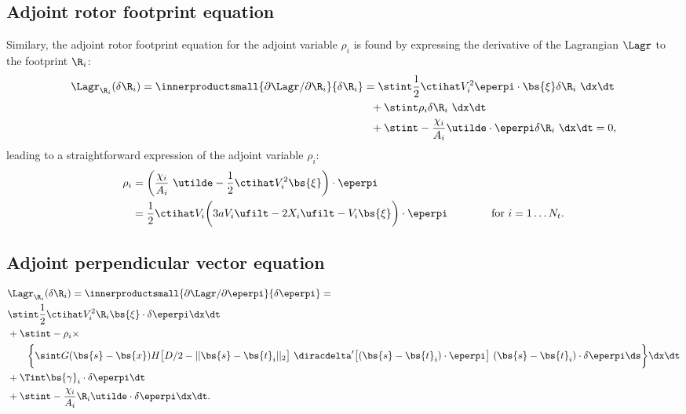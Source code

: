 \subsection{Adjoint rotor footprint equation}
Similary, the adjoint rotor footprint equation for the adjoint variable $\rho_i$ is found by expressing the derivative of the Lagrangian $\Lagr$ to the footprint $\R_i$: 
\begin{align}
\Lagr_{\R_i}(\delta \R_i) = \innerproductsmall{\partial \Lagr / \partial \R_i}{\delta \R_i} &= 
\stint \frac{1}{2} \ctihat V_i^2 \eperpi \cdot \bs{\xi} \delta \R_i ~\dx \dt \nonumber \\
& \ \ + \stint \rho_i \delta \R_i ~\dx \dt \nonumber \\
& \ \ + \stint -\frac{\chi_i}{A_i} \utilde \cdot \eperpi \delta \R_i ~\dx \dt = 0,
\end{align}    
leading to a straightforward expression of the adjoint variable $\rho_i$:
\begin{align}
\rho_i &= \bigg( \frac{\chi_i}{A_i}~\utilde - \frac{1}{2} \ctihat V_i^2 \bs{\xi} \bigg) \cdot \eperpi \label{eq:rho_i_1}  \\
 &= \frac{1}{2} \ctihat V_i \bigg(3aV_i \ufilt  -2 X_i \ufilt - V_i\bs{\xi} \bigg) \cdot \eperpi \qquad\qquad \text{for } i=1\dots N_t. \label{eq:rho_i}
\end{align}

\subsection{Adjoint perpendicular vector equation}

{\small
\begin{align}
&\Lagr_{\R_i}(\delta \R_i) =\innerproductsmall {\partial \Lagr / \partial \eperpi}{\delta \eperpi} = \nonumber \\
& \stint \frac{1}{2} \ctihat V_i^2 \R_i \bs{\xi} \cdot \delta \eperpi \dx \dt \nonumber \\
& + \stint - \rho_i \times \nonumber \\
& \qquad \bigg\{ \sint G(\bs{s} - \bs{x})  H\big[D/2 - \vert\vert \bs{s} - \bs{t}_i \vert\vert_2 \big]~\diracdelta'\big[(\bs{s} - \bs{t}_i) \cdot \eperpi \big]~(\bs{s} - \bs{t}_i) \cdot \delta \eperpi \ds \bigg\} \dx \dt \nonumber\\
& + \Tint \bs{\gamma}_i \cdot \delta \eperpi \dt \nonumber \\ 
& + \stint -\frac{\chi_i}{A_i} \R_i \utilde \cdot \delta \eperpi \dx \dt \label{eq:app_adj_perp1}.
\end{align}}

